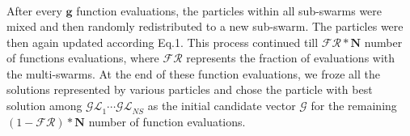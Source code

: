 \documentclass[12pt]{article}
\begin{document}
\begin{eqnarray}
\end{eqnarray}

\begin{algorithm}
\end{algorithm}

After every $\mathbf{g}$  function evaluations, the particles within all sub-swarms were mixed and then randomly redistributed to a new sub-swarm. The particles were then again updated according Eq.1. This process continued till $\mathcal{FR}*\mathbf{N}$ number of functions evaluations, where $\mathcal{FR}$ represents the fraction of evaluations with the multi-swarms. At the end of these function evaluations, we froze all the solutions represented by various particles and chose the particle with best solution among $\mathcal{GL}_{1} \cdots \mathcal{GL}_{NS}$ as the initial candidate vector $\mathcal{G}$ for the remaining $({1}-\mathcal{FR})*\mathbf{N}$ number of function evaluations.
\end{document}
